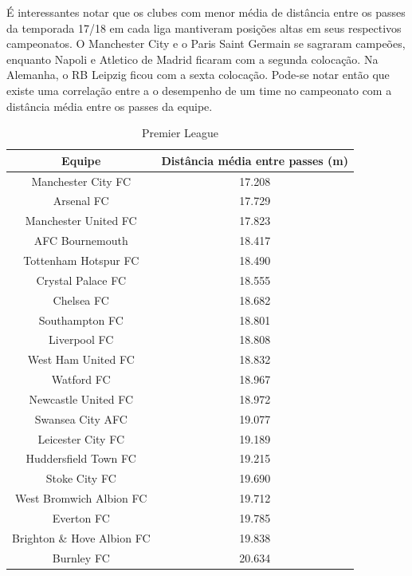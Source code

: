 \documentclass{article}
\begin{document}
É interessantes notar que os clubes com menor média de distância entre os
passes da temporada 17/18 em cada liga mantiveram posições altas em seus
respectivos campeonatos. O Manchester City e o Paris Saint Germain se sagraram
campeões, enquanto Napoli e Atletico de Madrid ficaram com a segunda colocação.
Na Alemanha, o RB Leipzig ficou com a sexta colocação. Pode-se notar então que
existe uma correlação entre a o desempenho de um time no campeonato com a
distância média entre os passes da equipe.

\begin{table}[H]
	\centering
	\begin{tabular}{|c|c|}
		\hline
		\textbf{Equipe}            & \textbf{Distância média entre
			passes (m)}
		\\ \hline
		Manchester City FC         & 17.208
		\\ \hline
		Arsenal FC                 & 17.729
		\\ \hline
		Manchester United FC       & 17.823
		\\ \hline
		AFC Bournemouth            & 18.417
		\\ \hline
		Tottenham Hotspur FC       & 18.490
		\\ \hline
		Crystal Palace FC          & 18.555
		\\ \hline
		Chelsea FC                 & 18.682
		\\ \hline
		Southampton FC             & 18.801
		\\ \hline
		Liverpool FC               & 18.808
		\\ \hline
		West Ham United FC         & 18.832
		\\ \hline
		Watford FC                 & 18.967
		\\ \hline
		Newcastle United FC        & 18.972
		\\ \hline
		Swansea City AFC           & 19.077
		\\ \hline
		Leicester City FC          & 19.189
		\\ \hline
		Huddersfield Town FC       & 19.215
		\\ \hline
		Stoke City FC              & 19.690
		\\ \hline
		West Bromwich Albion FC    & 19.712
		\\ \hline
		Everton FC                 & 19.785
		\\ \hline
		Brighton \& Hove Albion FC & 19.838
		\\ \hline
		Burnley FC                 & 20.634
		\\ \hline
	\end{tabular}
	\caption{Premier League}
	\label{tab:average_distance_england}
\end{table}
\end{document}
